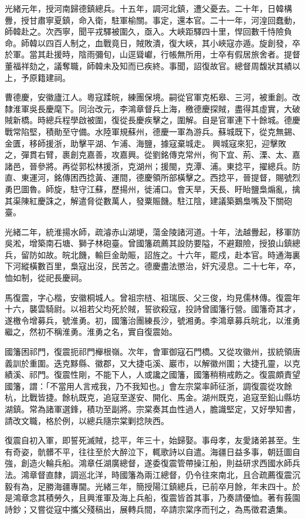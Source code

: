 \begin{pinyinscope}
光緒元年，授河南歸德鎮總兵。十五年，調河北鎮，遭父憂去。二十年，日韓構釁，授甘肅寧夏鎮，命入衛，駐軍榆關。事定，還本官。二十一年，河湟回蠢動，師韓赴之。次西寧，聞平戎驛被圍久，亟入。大峽距驛四十里，悍回數千恃險負命。師韓以四百人制之，血戰竟日，賊敗潰，復大峽，其小峽寇亦遁。旋創發，卒於軍。當其赴援時，陰雨彌旬，山逕聳巘，行帳無所用，士卒有假居旅舍者。提督董福祥劾之，議奪職，師韓未及知而已疾終。事聞，詔復故官。總督周馥狀其績以上，予原籍建祠。

曹德慶，安徽廬江人。粵寇蹂皖，練團保境。嗣從官軍克柘皋、三河，被重創。改隸淮軍吳長慶麾下。同治改元，李鴻章督兵上海，檄德慶探賊，盡得其虛實，大破賊新橋。時總兵程學啟被圍，復從長慶疾擊之，圍解。自是官軍連下十餘城。德慶戰常陷堅，積勛至守備。水陸軍規蘇州，德慶一軍為游兵。蘇城既下，從克無錫、金匱，移師援浙，助擊平湖、乍浦、海鹽，據寇棄城走。興城寇來犯，迎擊敗之，彈貫右臂，裹創克嘉善，攻嘉興。從劉銘傳克常州，徇下宜、荊、溧、太、嘉諸邑，晉參將。再從郭松林援浙，克湖州；援閩，克潭、浦。東捻平，擢總兵。防直、東運河，銘傳困西捻黃、運間，德慶領所部橫擊之。西捻平，晉提督，賜號烈勇巴圖魯。師旋，駐守江蘇，歷揚州，徙浦口。會天旱，天長、盱眙鹽梟煽亂，擒其渠陳紅慶誅之，解遣脅從數萬人，發粟賑饑。駐江陰，建議築鵝梟嘴及下關砲臺。

光緒二年，統淮揚水師，疏濬赤山湖埂，蕩金陵諸河道。十年，法越釁起，移軍防吳淞，增築南石塘、獅子林砲臺。曾國籓疏薦其設防要隘，不避艱險，授狼山鎮總兵，留防如故。皖北饑，輸巨金助賑，詔旌之。十六年，罷戍，赴本官。時通海裏下河縱橫數百里，梟寇出沒，民苦之。德慶盡法懲治，奸宄浸息。二十七年，卒，恤如制，從祀長慶祠。

馬復震，字心楷，安徽桐城人。曾祖宗梿、祖瑞辰、父三俊，均見儒林傳。復震年十六，襲雲騎尉。以祖若父均死於賊，誓欲殺寇，投詩曾國籓行營。國籓奇其才，遂檄令增募兵，號淮勇。初，國籓治團練長沙，號湘勇。李鴻章募兵皖北，以淮勇繼之，然初不稱淮勇。淮勇之名，實自復震始。

國籓困祁門，復震扼祁門櫸根嶺。次年，會軍御寇石門橋。又從攻徽州，拔統領唐義訓於重圍。迭克黟縣、徽郡，又大捷屯溪、巖市，以解徽州圍；大捷孔靈，以克績溪、祁門。復震性剛，不能下人，人或讒之國籓，國籓稍稍戒飭之。復震頗責望國籓，謂：「不當用人言戒我，乃不我知也。」會左宗棠率師征浙，調復震從攻餘杭，比戰皆捷。餘杭既克，追寇至遂安、開化、馬金。湖州既克，追寇至鉛山縣坊湖鎮。常為諸軍選鋒，積功至副將。宗棠奏其血性過人，膽識堅定，又好學知書，請改文職，格於例，以總兵隨宗棠剿捻陜西。

復震自初入軍，即誓死滅賊，捻平，年三十，始歸娶。事母孝，友愛諸弟甚至。生有奇姿，骯髒不平，往往至於大醉泣下，輒歌詩以自遣。海疆日益多事，朝廷圖自強，創造火輪兵船。鴻章任湖廣總督，遂委復震管帶操江船，則益研求西國水師兵法。鴻章督直隸，調巡北洋，時國籓為兩江總督，仍令往來南北，且合疏薦復震沉毅有為，足勝海疆專閫。光緒三年，簡授陽江鎮總兵，已前卒月餘，年未四十。於是鴻章念其積勞久，且興淮軍及海上兵船，復震皆首其事，乃奏請優恤。著有莪園詩鈔；又嘗從寇中攜父殘稿出，展轉兵間，卒請宗棠序而刊之，為馬徵君遺集。


\end{pinyinscope}
